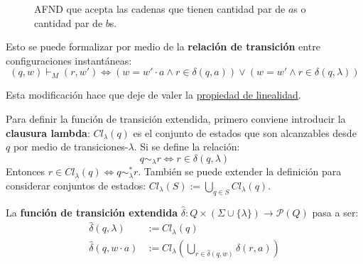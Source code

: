 \begin{figure}[H]
    \centering
    \caption*{AFND que acepta las cadenas que tienen cantidad par de $a$s o cantidad par de $b$s.}
\end{figure}

Esto se puede formalizar por medio de la \textbf{relación de transición} entre configuraciones instantáneas:
$$
(q, w) \vdash_M (r, w') \iff (w = w' \cdot a \land r \in \delta(q, a)) \lor (w = w' \land r \in \delta(q, \lambda))
$$

Esta modificación hace que deje de valer la \hyperref[subsubsec-propiedades-rel-transicion]{propiedad de linealidad}.

Para definir la función de transición extendida, primero conviene introducir la \textbf{clausura lambda}: $Cl_\lambda(q)$ es el conjunto de estados que son alcanzables desde $q$ por medio de transiciones-$\lambda$. Si se define la relación:
$$q \sim_\lambda r \iff r \in \delta(q, \lambda)$$
Entonces $r \in Cl_\lambda(q) \iff q \sim_\lambda^* r$. También se puede extender la definición para considerar conjuntos de estados: $Cl_\lambda(S) := \bigcup_{q \in S} Cl_\lambda(q)$.

La \textbf{función de transición extendida} $\hat \delta : Q \times (\Sigma \cup \{\lambda\}) \to \mathcal P (Q)$ pasa a ser:
$$
\begin{aligned}
    \hat \delta (q, \lambda) & := Cl_\lambda(q) \\
    \hat \delta (q, w \cdot a) & := Cl_\lambda\left(\bigcup_{r \in \hat \delta(q, w)} \delta(r, a) \right)
\end{aligned}
$$

